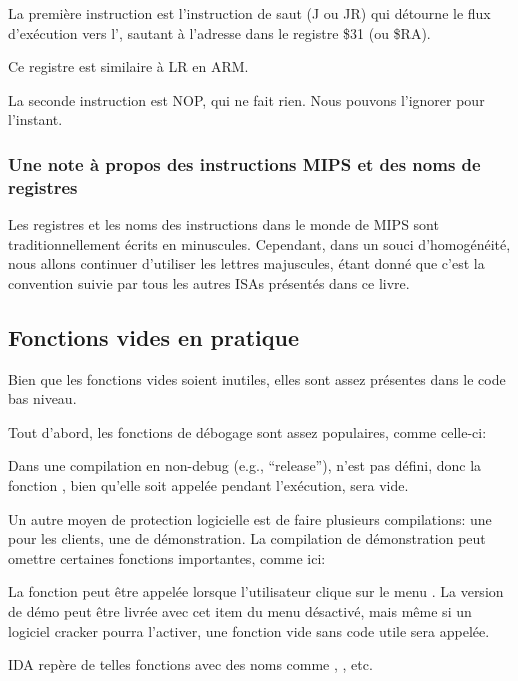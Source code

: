 

La première instruction est l'instruction de saut (J ou JR) qui détourne le flux
d'exécution vers l', sautant à l'adresse dans le registre
\$31 (ou \$RA).

Ce registre est similaire à \ac{LR} en ARM.

La seconde instruction est \ac{NOP}, qui ne fait rien.
Nous pouvons l'ignorer pour l'instant.

\subsubsection{Une note à propos des instructions MIPS et des noms de registres}

Les registres et les noms des instructions dans le monde de MIPS sont traditionnellement écrits en minuscules.
Cependant, dans un souci d'homogénéité, nous allons continuer d'utiliser les lettres majuscules,
étant donné que c'est la convention suivie par tous les autres \ac{ISA}s présentés dans ce livre.

\subsection{Fonctions vides en pratique}

Bien que les fonctions vides soient inutiles, elles sont assez présentes dans le code bas niveau.

Tout d'abord, les fonctions de débogage sont assez populaires, comme celle-ci:



Dans une compilation en non-debug (e.g., ``release''),  n'est pas défini,
donc la fonction , bien qu'elle soit appelée pendant l'exécution,
sera vide.

Un autre moyen de protection logicielle est de faire plusieurs compilations: une pour les clients, une de démonstration.
La compilation de démonstration peut omettre certaines fonctions importantes, comme ici:



La fonction  peut être appelée lorsque l'utilisateur clique sur le menu .
La version de démo peut être livrée avec cet item du menu désactivé, mais même si un logiciel cracker pourra l'activer,
une fonction vide sans code utile sera appelée.

IDA repère de telles fonctions avec des noms comme , , etc.

